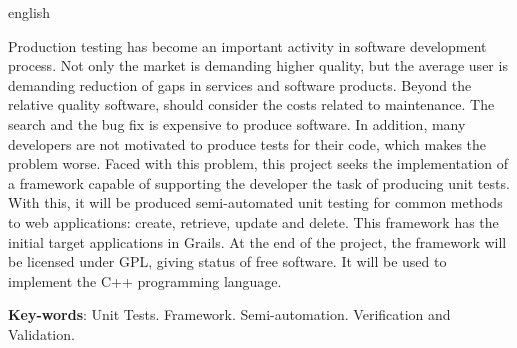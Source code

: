 \begin{resumo}[Abstract]
 \begin{otherlanguage*}{english}

\vspace{\onelineskip}
Production testing has become an important activity in software development process. Not only the market is demanding higher quality, but the average user is demanding reduction of gaps in services and software products. Beyond the relative quality software, should consider the costs related to maintenance. The search and the bug fix is expensive to produce software. In addition, many developers are not motivated to produce tests for their code, which makes the problem worse. Faced with this problem, this project seeks the implementation of a framework capable of supporting the developer the task of producing unit tests. With this, it will be produced semi-automated unit testing for common methods to web applications: create, retrieve, update and delete. This framework has the initial target applications in Grails. At the end of the project, the framework will be licensed under GPL, giving status of free software. It will be used to implement the C++ programming language.
\noindent 
   
   \textbf{Key-words}: Unit Tests. Framework. Semi-automation. Verification and Validation.
 \end{otherlanguage*}
\end{resumo}
